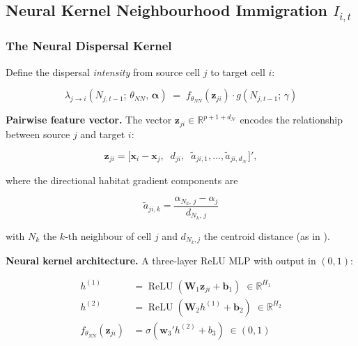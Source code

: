 \documentclass[12pt,a4paper]{article}
\theoremstyle{definition}
\newcommand{\bx}{\bm{x}}
\newcommand{\bz}{\bm{z}}
\newcommand{\bW}{\bm{W}}
\newcommand{\balpha}{\bm{\alpha}}
\newcommand{\bw}{\bm{w}}
\newcommand{\nn}{f_{\theta_{NN}}}
\begin{document}
\subsection{Neural Kernel Neighbourhood Immigration \texorpdfstring{$I_{i,t}$}{I}}

\subsubsection{The Neural Dispersal Kernel}

Define the dispersal \emph{intensity} from source cell $j$ to target cell $i$:

\begin{equation}
  \lambda_{j\to i}(N_{j,t-1};\, \theta_{NN},\, \balpha)
  \;=\;
  \nn\!\left(\bz_{ji}\right) \cdot g(N_{j,t-1};\, \gamma)
  \label{eq:kernel}
\end{equation}

\noindent\textbf{Pairwise feature vector.}  The vector
$\bz_{ji} \in \mathbb{R}^{p+1+d_\mathcal{N}}$ encodes the relationship between
source $j$ and target $i$:

\begin{equation}
  \bz_{ji}
  = \bigl[\bx_i - \bx_j,\;\; d_{ji},\;\;
    \tilde{a}_{ji,1}, \ldots, \tilde{a}_{ji,d_\mathcal{N}}\bigr]',
  \label{eq:feature}
\end{equation}

where the directional habitat gradient components are

\begin{equation}
  \tilde{a}_{ji,k}
  = \frac{\alpha_{N_k,\,j} - \alpha_j}{d_{N_k,\,j}}
  \label{eq:gradient}
\end{equation}

with $N_k$ the $k$-th neighbour of cell $j$ and $d_{N_k,j}$ the centroid
distance (as in \citealt{hooten2010}).

\noindent\textbf{Neural kernel architecture.}  A three-layer ReLU MLP with output in $(0,1)$:

\begin{align}
  h^{(1)} &= \operatorname{ReLU}\!\left(\bW_1 \bz_{ji} + \bm{b}_1\right)
    \;\in \mathbb{R}^{H_1}
  \label{eq:nn1}\\
  h^{(2)} &= \operatorname{ReLU}\!\left(\bW_2 h^{(1)} + \bm{b}_2\right)
    \;\in \mathbb{R}^{H_2}
  \label{eq:nn2}\\
  \nn(\bz_{ji}) &= \sigma\!\left(\bw_3' h^{(2)} + b_3\right) \;\in (0,1)
  \label{eq:nn3}
\end{align}
\end{document}
